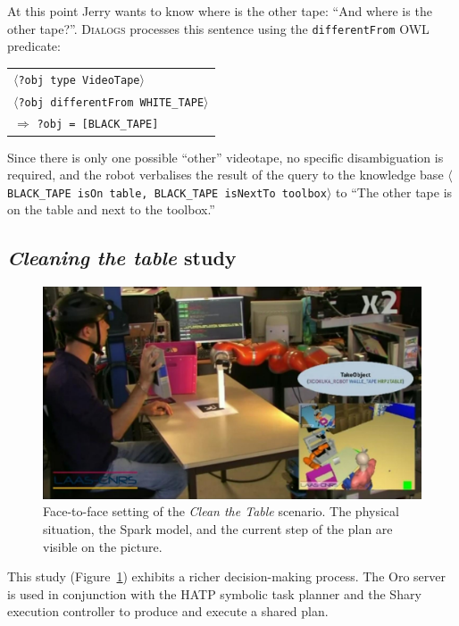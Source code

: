 \documentclass[preprint,3p,times]{elsarticle}
\newcommand{\concept}[1]{{\small \texttt{#1}}}
\newcommand{\stmt}[1]{{\footnotesize\tt$\langle$#1\relax$\rangle$}}
\begin{document}
At this point Jerry wants to know where is the other tape: ``And where is the
other tape?''. \textsc{Dialogs} processes this sentence using the
\concept{differentFrom} OWL predicate:

\begin{center}
\begin{tabular}{l}
\stmt{?obj type VideoTape}\\
\stmt{?obj differentFrom WHITE\_TAPE}\\
\hspace{0.7cm}$\Rightarrow$ \concept{?obj = [BLACK\_TAPE]}
\end{tabular}
\end{center}

Since there is only one possible ``other'' videotape, no specific disambiguation is
required, and the robot verbalises the result of the query to the knowledge
base \stmt{BLACK\_TAPE isOn table, BLACK\_TAPE isNextTo toolbox} to ``The other
tape is on the table and next to the toolbox.''

\subsection{\emph{Cleaning the table} study}

\begin{figure}[ht!]
    \centering
    \includegraphics[width=0.6\columnwidth]{cleantable.jpg}

    \caption{Face-to-face setting of the \emph{Clean the Table} scenario. The
    physical situation, the {\sc Spark} model, and the current step of the plan
    are visible on the picture.}

    \label{fig|cleantable-video}
\end{figure}


This study (Figure~\ref{fig|cleantable-video}) exhibits a richer decision-making
process. The {\sc Oro} server is used in conjunction with the HATP symbolic task
planner and the {\sc Shary} execution controller to produce and execute a shared
plan.

\end{document}
